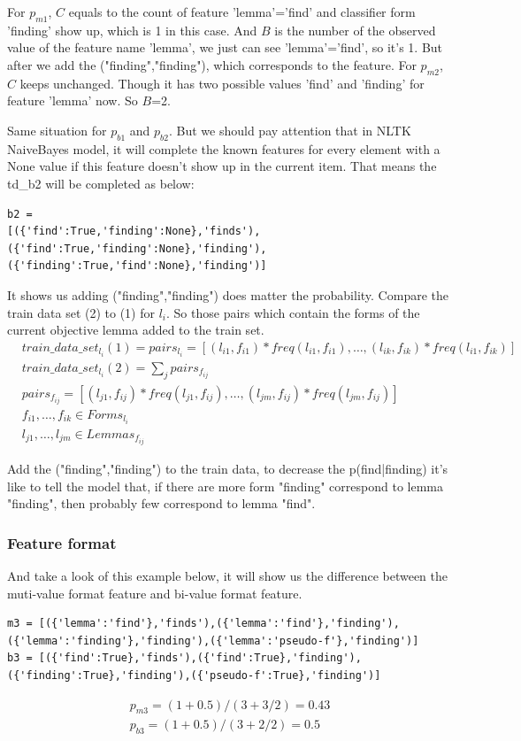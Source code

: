 \documentclass[a4paper]{article}
\begin{document}
For $p_{m1}$, $C$ equals to the count of feature 'lemma'='find' and classifier form 'finding' show up, which is 1 in this case. And $B$ is the number of the observed value of the feature name 'lemma', we just can see 'lemma'='find', so it's 1.
But after we add the ("finding","finding"), which corresponds to the feature. For $p_{m2}$, $C$ keeps unchanged. Though it has two possible values 'find' and 'finding' for feature 'lemma' now. So $B$=2.

Same situation for $p_{b1}$ and $p_{b2}$. But we should pay attention that in NLTK NaiveBayes model, it will complete the known features for every element with a None value if this feature doesn't show up in the current item. That means the td\_b2 will be completed as below:
\begin{lstlisting}
b2 =
[({'find':True,'finding':None},'finds'),
({'find':True,'finding':None},'finding'),
({'finding':True,'find':None},'finding')]
\end{lstlisting}

It shows us adding ("finding","finding") does matter the probability. Compare the train data set (2) to (1) for $l_i$. So those pairs which contain the forms of the current objective lemma added to the train set.
\begin{align*}
&train\_data\_set_{l_i} (1) = pairs_{l_{i}} = [ (l_{i1},f_{i1})*freq(l_{i1},f_{i1}),\dots,(l_{ik},f_{ik})*freq(l_{i1},f_{ik})] \\
&train\_data\_set_{l_i} (2)= \sum_{j} pairs_{f_{ij}} \\
&pairs_{f_{ij}}=[ (l_{j1},f_{ij})*freq(l_{j1},f_{ij}),\dots,(l_{jm},f_{ij})*freq(l_{jm},f_{ij}) ] \\ 
&f_{i1},\dots,f_{ik} \in Forms_{l_i} \\
&l_{j1},\dots,l_{jm} \in Lemmas_{f_{ij}} 
\end{align*}

Add the ("finding","finding") to the train data, to decrease the p(find|finding) it's like to tell the model that, if there are more form "finding" correspond to lemma "finding", then probably few correspond to lemma "find". 

\subsubsection{Feature format}
And take a look of this example below, it will show us the difference between the muti-value format feature and bi-value format feature. 

\begin{lstlisting}
m3 = [({'lemma':'find'},'finds'),({'lemma':'find'},'finding'), ({'lemma':'finding'},'finding'),({'lemma':'pseudo-f'},'finding')]
b3 = [({'find':True},'finds'),({'find':True},'finding'),
({'finding':True},'finding'),({'pseudo-f':True},'finding')]
\end{lstlisting}
\begin{align*}
p_{m3}=(1+0.5)/(3+3/2)=0.43 \\
p_{b3}=(1+0.5)/(3+2/2)=0.5 
\end{align*}
\end{document}
